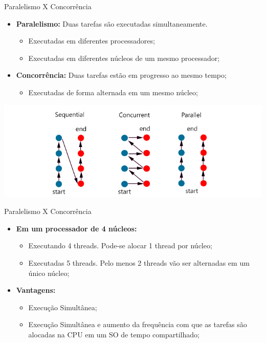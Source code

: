 \documentclass[10pt]{beamer}
\begin{document}
\begin{frame}{Paralelismo X Concorrência}
	\begin{itemize}
		\item \textbf{Paralelismo:} Duas tarefas são executadas simultaneamente.
		\begin{itemize}
			\item Executadas em diferentes processadores;
			\item Executadas em diferentes núcleos de um mesmo processador;
		\end{itemize}
		\vspace{0.2cm}
		\item \textbf{Concorrência:} Duas tarefas estão em progresso ao mesmo tempo;
		\begin{itemize}
			\item Executadas de forma alternada em um mesmo núcleo;
		\end{itemize}
	\end{itemize}
	\includegraphics[width=\textwidth]{imgs/compare}
\end{frame}

\begin{frame}{Paralelismo X Concorrência}
	\begin{itemize}
		\item \textbf{Em um processador de 4 núcleos:}
		\begin{itemize}
			\item Executando 4 threads. Pode-se alocar 1 thread por núcleo;
			\vspace{0.2cm}
			\item Executadas 5 threads. Pelo menos 2 threads vão ser alternadas em um único núcleo;
		\end{itemize}
	\end{itemize}
	\begin{itemize}
		\item \textbf{Vantagens:}
		\begin{itemize}
			\item Execução Simultânea;
			\vspace{0.2cm}
			\item Execução Simultânea e aumento da frequência com que as tarefas são alocadas na CPU em um SO de tempo compartilhado;
		\end{itemize}
	\end{itemize}
\end{frame}
\end{document}
